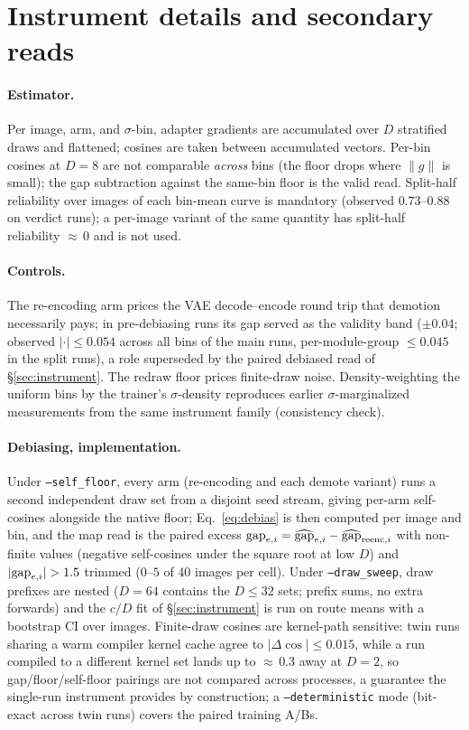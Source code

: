 \section{Instrument details and secondary reads}
\label{app:instrument}

\paragraph{Estimator.} Per image, arm, and $\sigma$-bin, adapter gradients
are accumulated over $D$ stratified draws and flattened; cosines are taken
between accumulated vectors. Per-bin cosines at $D{=}8$ are not comparable
\emph{across} bins (the floor drops where $\|g\|$ is small); the gap
subtraction against the same-bin floor is the valid read. Split-half
reliability over images of each bin-mean curve is mandatory
(observed $0.73$--$0.88$ on verdict runs); a per-image variant of the same
quantity has split-half reliability ${\approx}\,0$ and is not used.

\paragraph{Controls.} The re-encoding arm prices the VAE decode--encode
round trip that demotion necessarily pays; in pre-debiasing runs its gap
served as the validity band ($\pm 0.04$; observed $|\cdot| \le 0.054$
across all bins of the main runs, per-module-group $\le 0.045$ in the
split runs), a role superseded by the paired debiased read of
\S\ref{sec:instrument}. The redraw floor prices finite-draw noise.
Density-weighting the uniform bins by the trainer's $\sigma$-density
reproduces earlier $\sigma$-marginalized measurements from the same
instrument family (consistency check).

\paragraph{Debiasing, implementation.} Under
\texttt{--self\_floor}, every arm (re-encoding and each demote variant)
runs a second independent draw set from a disjoint seed stream, giving
per-arm self-cosines alongside the native floor; Eq.~\ref{eq:debias} is
then computed per image and bin, and the map read is the paired
excess $\mathrm{gap}_{e,i} = \widehat{\mathrm{gap}}_{e,i} - \widehat{\mathrm{gap}}_{\mathrm{reenc},i}$ with non-finite
values (negative self-cosines under the square root at low $D$) and
$|\mathrm{gap}_{e,i}| > 1.5$ trimmed ($0$--$5$ of $40$ images per cell). Under
\texttt{--draw\_sweep}, draw prefixes are nested ($D = 64$ contains the
$D \le 32$ sets; prefix sums, no extra forwards) and the $c/D$ fit of
\S\ref{sec:instrument} is run on route means with a bootstrap CI
over images. Finite-draw cosines are kernel-path sensitive: twin runs
sharing a warm compiler kernel cache agree to $|\Delta\cos| \le 0.015$,
while a run compiled to a different kernel set lands up to
${\approx}\,0.3$ away at $D{=}2$, so gap/floor/self-floor pairings
are not compared across processes, a guarantee the single-run
instrument provides by construction; a \texttt{--deterministic} mode
(bit-exact across twin runs) covers the paired training A/Bs.

